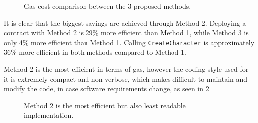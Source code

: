 \begin{figure}[ht!]
    \caption{Gas cost comparison between the 3 proposed methods.}
    \label{fig:gascomp}
\end{figure}

It is clear that the biggest savings are achieved through Method 2. Deploying a contract with Method 2 is 29\% more efficient than Method 1, while Method 3 is only 4\% more efficient than Method 1. Calling \texttt{CreateCharacter} is approximately 36\% more efficient in both methods compared to Method 1. 

Method 2 is the most efficient in terms of gas, however the coding style used for it is extremely compact and non-verbose, which makes difficult to maintain and modify the code, in case software requirements change, as seen in \ref{fig:method2:comparison}

\begin{figure}[ht!]
    \caption{Method 2 is the most efficient but also least readable implementation.}
    \label{fig:method2:comparison}
\end{figure}

